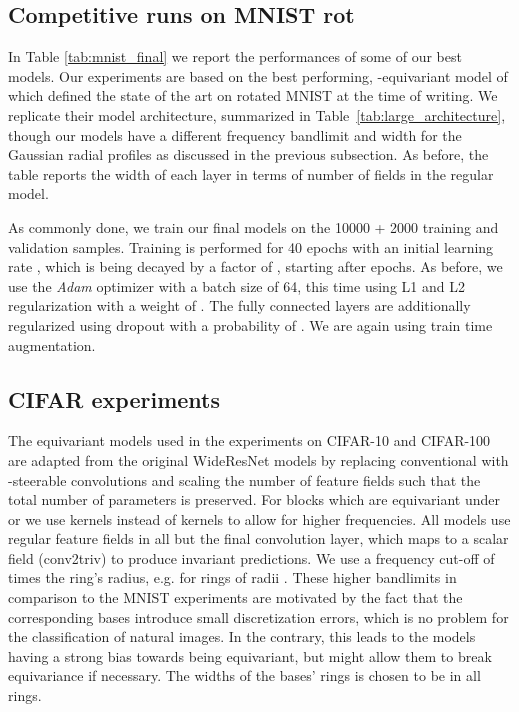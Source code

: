 \documentclass{article}
\begin{document}
{{\subsection{Competitive runs on MNIST rot}
\label{apx:mnist_final}

In Table \ref{tab:mnist_final} we report the performances of some of our best models.
Our experiments are based on the best performing, -equivariant model of \cite{Weiler2018-STEERABLE} which defined the state of the art on rotated MNIST at the time of writing.
We replicate their model architecture, summarized in Table~\ref{tab:large_architecture}, though our models have a different frequency bandlimit and width  for the Gaussian radial profiles as discussed in the previous subsection.
As before, the table reports the width of each layer in terms of number of fields in the  regular model.

As commonly done, we train our final models on the 10000 + 2000 training and validation samples.
Training is performed for 40 epochs with an initial learning rate , which is being decayed by a factor of , starting after  epochs.
As before, we use the \textit{Adam} optimizer with a batch size of 64, this time using L1 and L2 regularization with a weight of .
The fully connected layers are additionally regularized using dropout with a probability of .
We are again using train time augmentation.





\subsection{CIFAR experiments}
\label{apx:cifar}

The equivariant models used in the experiments on CIFAR-10 and CIFAR-100 are adapted from the original WideResNet models by replacing conventional with -steerable convolutions and scaling the number of feature fields such that the total number of parameters is preserved.
For blocks which are equivariant under  or  we use  kernels instead of  kernels to allow for higher frequencies. 
All models use regular feature fields in all but the final convolution layer, which maps to a scalar field (conv2triv) to produce invariant predictions.
We use a frequency cut-off of  times the ring's radius, e.g.  for rings of radii .
These higher bandlimits in comparison to the MNIST experiments are motivated by the fact that the corresponding bases introduce small discretization errors, which is no problem for the classification of natural images.
In the contrary, this leads to the models having a strong bias towards being equivariant, but might allow them to break equivariance if necessary.
The widths of the bases' rings is chosen to be  in all rings.

}}
\end{document}
